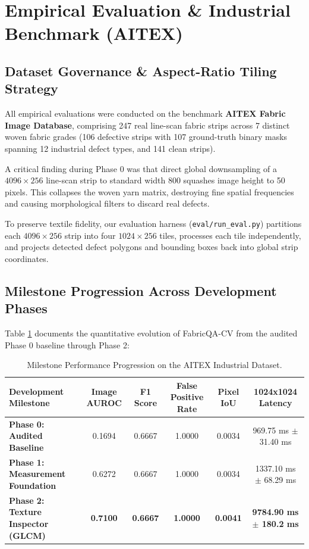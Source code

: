 \documentclass[10pt,a4paper]{article}
\begin{document}
\section{Empirical Evaluation \& Industrial Benchmark (AITEX)}

\subsection{Dataset Governance \& Aspect-Ratio Tiling Strategy}
All empirical evaluations were conducted on the benchmark \textbf{AITEX Fabric Image Database}, comprising 247 real line-scan fabric strips across 7 distinct woven fabric grades (106 defective strips with 107 ground-truth binary masks spanning 12 industrial defect types, and 141 clean strips).

\begin{tcolorbox}[colback=lightgraybg,colframe=primaryblue,arc=2mm,boxrule=1pt,title=\textbf{Methodological Breakthrough: Line-Scan Aspect Ratio Tiling}]
A critical finding during Phase 0 was that direct global downsampling of a $4096 \times 256$ line-scan strip to standard width 800 squashes image height to 50 pixels. This collapses the woven yarn matrix, destroying fine spatial frequencies and causing morphological filters to discard real defects. 

To preserve textile fidelity, our evaluation harness (\texttt{eval/run\_eval.py}) partitions each $4096 \times 256$ strip into four $1024 \times 256$ tiles, processes each tile independently, and projects detected defect polygons and bounding boxes back into global strip coordinates.
\end{tcolorbox}

\subsection{Milestone Progression Across Development Phases}
Table \ref{tab:milestone_progression} documents the quantitative evolution of FabricQA-CV from the audited Phase 0 baseline through Phase 2:

\begin{table}[htbp]
\centering
\small
\begin{tabularx}{\textwidth}{l c c c c c}
\toprule
\textbf{Development Milestone} & \textbf{Image AUROC} & \textbf{F1 Score} & \textbf{False Positive Rate} & \textbf{Pixel IoU} & \textbf{1024x1024 Latency} \\
\midrule
\textbf{Phase 0: Audited Baseline} & 0.1694 & 0.6667 & 1.0000 & 0.0034 & 969.75 ms $\pm$ 31.40 ms \\
\textbf{Phase 1: Measurement Foundation} & 0.6272 & 0.6667 & 1.0000 & 0.0034 & 1337.10 ms $\pm$ 68.29 ms \\
\textbf{Phase 2: Texture Inspector (GLCM)} & \textbf{0.7100} & \textbf{0.6667} & \textbf{1.0000} & \textbf{0.0041} & \textbf{9784.90 ms $\pm$ 180.2 ms} \\
\bottomrule
\end{tabularx}
\caption{Milestone Performance Progression on the AITEX Industrial Dataset.}
\label{tab:milestone_progression}
\end{table}
\end{document}
